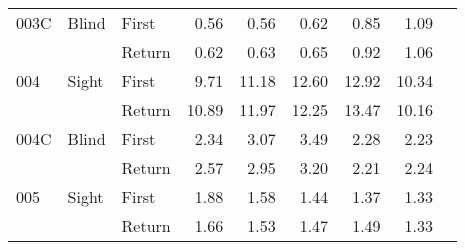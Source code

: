 \begin{table}[!htb]
\begin{tabular}{lllrrrrrr}
003C & Blind & First &   0.56 &   0.56 &                                                  0.62 &                                                   0.85 &    1.09 \\
    &       & Return &   0.62 &   0.63 &                                                  0.65 &                                                   0.92 &    1.06 \\
004 & Sight & First &   9.71 &  11.18 &                                                 12.60 &                                                  12.92 &   10.34 \\
    &       & Return &  10.89 &  11.97 &                                                 12.25 &                                                  13.47 &   10.16 \\
004C & Blind & First &   2.34 &   3.07 &                                                  3.49 &                                                   2.28 &    2.23 \\
    &       & Return &   2.57 &   2.95 &                                                  3.20 &                                                   2.21 &    2.24 \\
005 & Sight & First &   1.88 &   1.58 &                                                  1.44 &                                                   1.37 &    1.33 \\
    &       & Return &   1.66 &   1.53 &                                                  1.47 &                                                   1.49 &    1.33 \\
\bottomrule
\end{tabular}
\end{table}

